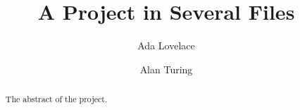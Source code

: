 \documentclass{article}
\title{A Project in Several Files}
\author{Ada Lovelace \and Alan Turing}
\begin{document}
\maketitle
\begin{abstract}
The abstract of the project.
\end{abstract}




\end{document}
